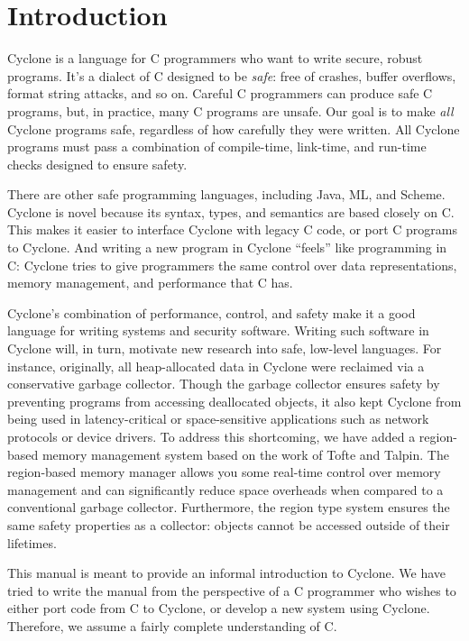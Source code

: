 \section{Introduction}

Cyclone is a language for C programmers who want to write secure,
robust programs.  It's a dialect of C designed to be \emph{safe}: free
of crashes, buffer overflows, format string attacks, and so on.
Careful C programmers can produce safe C programs, but, in practice,
many C programs are unsafe.  Our goal is to make \emph{all} Cyclone
programs safe, regardless of how carefully they were written.  All
Cyclone programs must pass a combination of compile-time, link-time,
and run-time checks designed to ensure safety.

There are other safe programming languages, including Java, ML, and
Scheme.  Cyclone is novel because its syntax, types, and semantics are
based closely on C\@.  This makes it easier to interface Cyclone with
legacy C code, or port C programs to Cyclone.  And writing a new
program in Cyclone ``feels'' like programming in C: Cyclone tries to
give programmers the same control over data representations, memory
management, and performance that C has.

Cyclone's combination of performance, control, and safety make it a
good language for writing systems and security software.  Writing such
software in Cyclone will, in turn, motivate new research into safe,
low-level languages.  For instance, originally, all heap-allocated
data in Cyclone were reclaimed via a conservative garbage collector.
Though the garbage collector ensures safety by preventing programs
from accessing deallocated objects, it also kept Cyclone from being
used in latency-critical or space-sensitive applications such as
network protocols or device drivers.  To address this shortcoming, we
have added a region-based memory management system based on the work
of Tofte and Talpin.  The region-based memory manager allows you some
real-time control over memory management and can significantly reduce
space overheads when compared to a conventional garbage collector.
Furthermore, the region type system ensures the same safety properties
as a collector: objects cannot be accessed outside of their lifetimes.

This manual is meant to provide an informal introduction to Cyclone.
We have tried to write the manual from the perspective of a C 
programmer who wishes to either port code from C to Cyclone, or
develop a new system using Cyclone.  Therefore, we assume a fairly
complete understanding of C.

